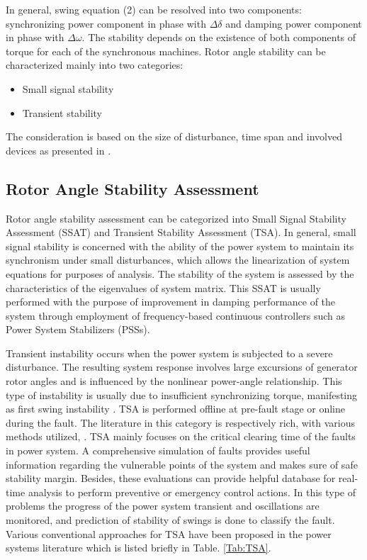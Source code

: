 \documentclass[journal]{IEEEtran}
\begin{document}
In general, swing equation (2) can be resolved into two components: synchronizing power component in phase with $\Delta \delta$ and damping power component in phase with $\Delta \omega$. The stability depends on the existence of both components of torque for each of the synchronous machines. Rotor angle stability can be characterized mainly into two categories: 
\begin{itemize} 
\item Small signal stability
\item Transient stability 
\end{itemize}
The consideration is based on the size of disturbance, time span and involved devices as presented in \cite{STBase}. 



\subsection{Rotor Angle Stability Assessment}
Rotor angle stability assessment can be categorized into Small Signal Stability Assessment (SSAT) and Transient Stability Assessment (TSA). In general, small signal stability is concerned with the ability of the power system to maintain its synchronism under small disturbances, which allows the linearization of system equations for purposes of analysis. The stability of the system is assessed by the characteristics of the eigenvalues of system matrix. This SSAT is usually performed with the purpose of improvement in damping performance of the system through employment of frequency-based continuous controllers such as Power System Stabilizers (PSSs). 


Transient instability occurs when the power system is subjected to a severe disturbance. The resulting system response involves large excursions of generator rotor angles and is influenced by the nonlinear power-angle relationship. This type of instability is usually due to insufficient synchronizing torque, manifesting as first swing instability \cite{STBase}. TSA is performed offline at pre-fault stage or online during the fault. The literature in this category is respectively rich, with various methods utilized, \cite{chiang1994bcu, vu2014lyapunov, amjadi1997transient, 153398, pai1989energy, 4766161, 4766154}. TSA mainly focuses on the critical clearing time of the faults in power system. A comprehensive simulation of faults provides useful information regarding the vulnerable points of the system and makes sure of safe stability margin. Besides, these evaluations can provide helpful database for real-time analysis to perform preventive or emergency control actions. In this type of problems the progress of the power system transient and oscillations are monitored, and prediction of stability of swings is done to classify the fault. Various conventional approaches for TSA have been proposed in the power systems literature which is listed briefly in Table. \ref{Tab:TSA}. 
\end{document}
